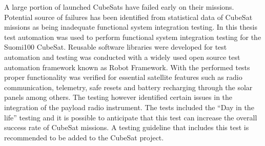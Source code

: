 \documentclass[english,12pt,a4paper,pdftex,elec,utf8]{aaltothesis}
\begin{document}
\makecoverpage



\begin{abstractpage}[english]
A large portion of launched CubeSats have failed early on their missions. Potential source of failures has been identified from statistical data of CubeSat missions as being inadequate functional system integration testing. 
In this thesis test automation was used to perform functional system integration testing for the Suomi100 CubeSat. Reusable software libraries were developed for test automation and testing was conducted with a widely used open source test automation framework known as Robot Framework. With the performed tests proper functionality was verified for essential satellite features such as radio communication, telemetry, safe resets and battery recharging through the solar panels among others. The testing however identified certain issues in the integration of the payload radio instrument. The tests included the “Day in the life” testing and it is possible to anticipate that this test can increase the overall success rate of CubeSat missions. A testing guideline that includes this test is recommended to be added to the CubeSat project. 

 
\end{abstractpage}
\end{document}
